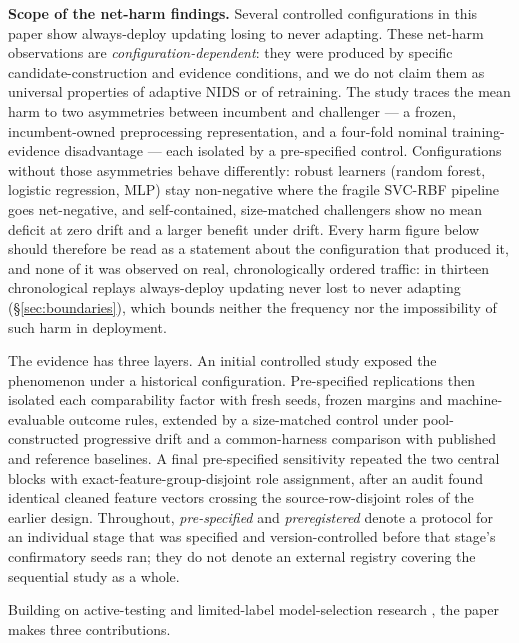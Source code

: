 \documentclass[journal]{IEEEtran}
\begin{document}
\textbf{Scope of the net-harm findings.} Several controlled configurations in this paper show always-deploy updating losing to never adapting. These net-harm observations are \emph{configuration-dependent}: they were produced by specific candidate-construction and evidence conditions, and we do not claim them as universal properties of adaptive NIDS or of retraining. The study traces the mean harm to two asymmetries between incumbent and challenger --- a frozen, incumbent-owned preprocessing representation, and a four-fold nominal training-evidence disadvantage --- each isolated by a pre-specified control. Configurations without those asymmetries behave differently: robust learners (random forest, logistic regression, MLP) stay non-negative where the fragile SVC-RBF pipeline goes net-negative, and self-contained, size-matched challengers show no mean deficit at zero drift and a larger benefit under drift. Every harm figure below should therefore be read as a statement about the configuration that produced it, and none of it was observed on real, chronologically ordered traffic: in thirteen chronological replays always-deploy updating never lost to never adapting (\S\ref{sec:boundaries}), which bounds neither the frequency nor the impossibility of such harm in deployment.


The evidence has three layers. An initial controlled study exposed the phenomenon under a historical configuration. Pre-specified replications then isolated each comparability factor with fresh seeds, frozen margins and machine-evaluable outcome rules, extended by a size-matched control under pool-constructed progressive drift and a common-harness comparison with published and reference baselines. A final pre-specified sensitivity repeated the two central blocks with exact-feature-group-disjoint role assignment, after an audit found identical cleaned feature vectors crossing the source-row-disjoint roles of the earlier design. Throughout, \emph{pre-specified} and \emph{preregistered} denote a protocol for an individual stage that was specified and version-controlled before that stage's confirmatory seeds ran; they do not denote an external registry covering the sequential study as a whole.


Building on active-testing and limited-label model-selection research \cite{sawade2012active,kossen2021active,karimi2021online,han2024model,okanovic2025models}, the paper makes three contributions.
\end{document}
